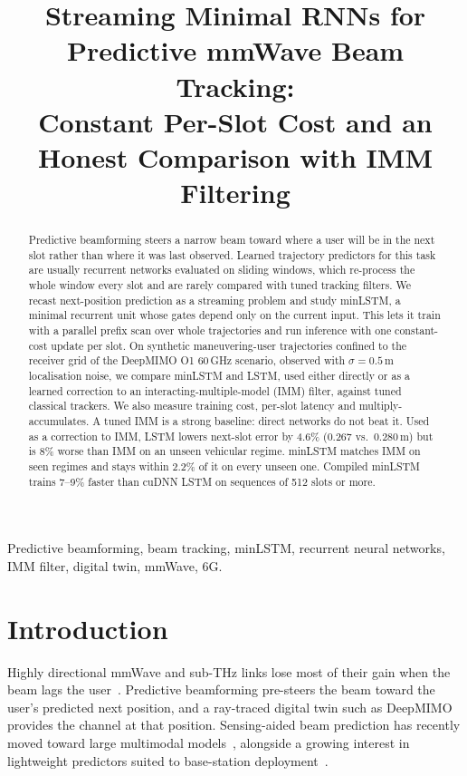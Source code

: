 \documentclass[conference]{IEEEtran}
\newcommand{\todo}[1]{\textcolor{red}{[TODO: #1]}}
\begin{document}
\title{Streaming Minimal RNNs for Predictive mmWave Beam Tracking:\\
Constant Per-Slot Cost and an Honest Comparison with IMM Filtering}

\author{\IEEEauthorblockN{\todo{Authors}}
\IEEEauthorblockA{\todo{Affiliation}}}

\maketitle

\begin{abstract}
Predictive beamforming steers a narrow beam toward where a user will be in the
next slot rather than where it was last observed. Learned trajectory predictors
for this task are usually recurrent networks evaluated on sliding windows,
which re-process the whole window every slot and are rarely compared with
tuned tracking filters. We recast next-position prediction as a streaming
problem and study minLSTM, a minimal recurrent unit whose gates depend only on
the current input. This lets it train with a parallel prefix scan over whole
trajectories and run inference with one constant-cost update per slot. On
synthetic maneuvering-user trajectories confined to the receiver grid of the
DeepMIMO O1 60\,GHz scenario, observed with $\sigma=0.5$\,m localisation
noise, we compare minLSTM and LSTM, used either directly or as a
learned correction to an interacting-multiple-model (IMM) filter, against tuned
classical trackers. We also measure training cost, per-slot latency and
multiply-accumulates. A tuned IMM is a strong baseline: direct networks do
not beat it. Used as a correction to IMM, LSTM lowers next-slot error by
4.6\% (0.267 vs.\ 0.280\,m) but is 8\% worse than IMM on an unseen vehicular
regime. minLSTM matches IMM on seen regimes and stays within 2.2\% of it on
every unseen one. Compiled minLSTM trains 7--9\% faster than cuDNN LSTM on
sequences of 512 slots or more.
\end{abstract}

\begin{IEEEkeywords}
Predictive beamforming, beam tracking, minLSTM, recurrent neural networks,
IMM filter, digital twin, mmWave, 6G.
\end{IEEEkeywords}

\section{Introduction}

Highly directional mmWave and sub-THz links lose most of their gain when the
beam lags the user~\cite{rappaport2019}. Predictive beamforming pre-steers the
beam toward the user's predicted next position, and a ray-traced digital twin
such as DeepMIMO~\cite{alkhateeb2019deepmimo} provides the channel at that
position. Sensing-aided beam prediction has recently moved toward large
multimodal models~\cite{beamllm2025, m2beamllm2025}, alongside a growing
interest in lightweight predictors suited to base-station
deployment~\cite{kdbeam2026, lightbeam2026}.
\end{document}
